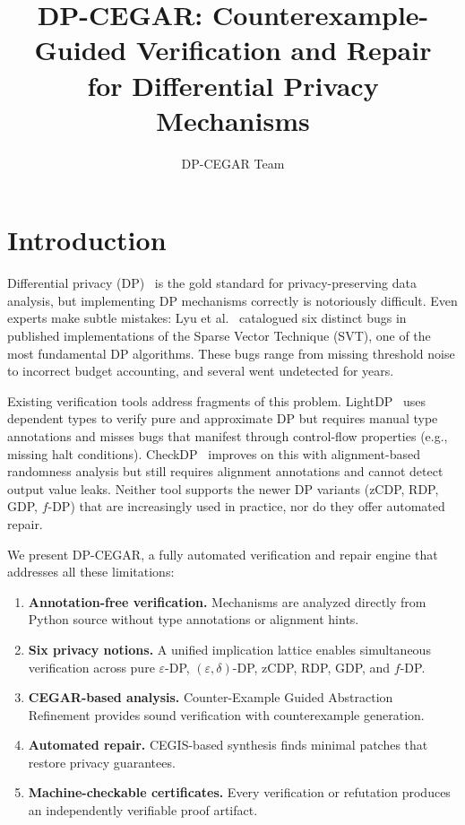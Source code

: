\documentclass[sigplan,screen,nonacm]{acmart}
\title{DP-CEGAR: Counterexample-Guided Verification and Repair\\for Differential Privacy Mechanisms}
\author{DP-CEGAR Team}
\affiliation{\institution{}}
\begin{document}
\maketitle

\section{Introduction}
\label{sec:intro}

Differential privacy (DP)~\cite{dwork2006calibrating} is the gold standard for
privacy-preserving data analysis, but implementing DP mechanisms correctly is
notoriously difficult. Even experts make subtle mistakes: Lyu et
al.~\cite{lyu2017understanding} catalogued six distinct bugs in published
implementations of the Sparse Vector Technique (SVT), one of the most
fundamental DP algorithms. These bugs range from missing threshold noise to
incorrect budget accounting, and several went undetected for years.

Existing verification tools address fragments of this problem. LightDP~\cite{zhang2017lightdp}
uses dependent types to verify pure and approximate DP but requires manual type
annotations and misses bugs that manifest through control-flow properties (e.g.,
missing halt conditions). CheckDP~\cite{wang2020checkdp} improves on this with
alignment-based randomness analysis but still requires alignment annotations and
cannot detect output value leaks. Neither tool supports the newer DP variants
(zCDP, RDP, GDP, $f$-DP) that are increasingly used in practice, nor do they
offer automated repair.

We present \textsc{DP-CEGAR}, a fully automated verification and repair engine
that addresses all these limitations:

\begin{enumerate}
\item \textbf{Annotation-free verification.} Mechanisms are analyzed directly
  from Python source without type annotations or alignment hints.
\item \textbf{Six privacy notions.} A unified implication lattice enables
  simultaneous verification across pure $\varepsilon$-DP, $(\varepsilon,\delta)$-DP,
  zCDP, RDP, GDP, and $f$-DP.
\item \textbf{CEGAR-based analysis.} Counter-Example Guided Abstraction
  Refinement provides sound verification with counterexample generation.
\item \textbf{Automated repair.} CEGIS-based synthesis finds minimal patches
  that restore privacy guarantees.
\item \textbf{Machine-checkable certificates.} Every verification or refutation
  produces an independently verifiable proof artifact.
\end{enumerate}
\end{document}
